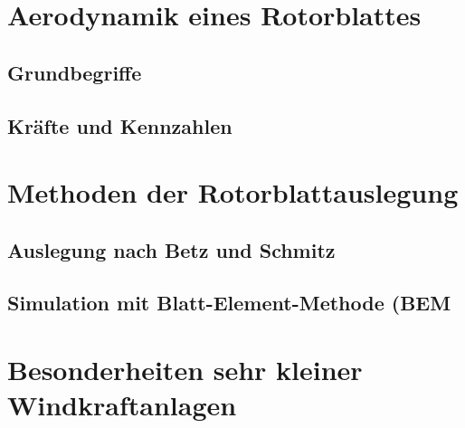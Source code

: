 \section{Aerodynamik eines Rotorblattes}
\subsection{Grundbegriffe}
\subsection{Kräfte und Kennzahlen}
\section{Methoden der Rotorblattauslegung}
\subsection{Auslegung nach Betz und Schmitz}
\subsection{Simulation mit Blatt-Element-Methode (BEM}
\section{Besonderheiten sehr kleiner Windkraftanlagen}